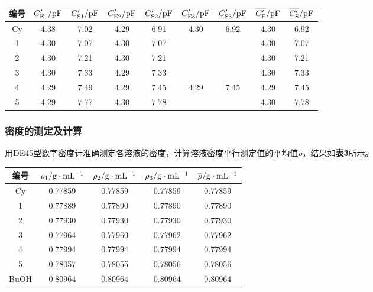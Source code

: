 \documentclass[12pt]{article}
\begin{document}
\begin{table}[h]
	\centering
	\begin{tabular}{ccccccccc}
		\toprule
		编号 & $C^{\prime}_{\rm E1}/{\rm pF}$ & $C^{\prime}_{\rm S1}/{\rm pF}$ & $C^{\prime}_{\rm E2}/{\rm pF}$ & $C^{\prime}_{\rm S2}/{\rm pF}$ & $C^{\prime}_{\rm E3}/{\rm pF}$ & $C^{\prime}_{\rm S3}/{\rm pF}$ & $\overline{C^{\prime}_{\rm E}}/{\rm pF}$ & $\overline{C^{\prime}_{\rm S}}/{\rm pF}$ \\
		\midrule
		Cy & 4.38 & 7.02 & 4.29 & 6.91 & 4.30 & 6.92 & 4.30 & 6.92 \\
		1  & 4.30 & 7.07 & 4.30 & 7.07 &      &      & 4.30 & 7.07 \\
		2  & 4.30 & 7.21 & 4.30 & 7.21 &      &      & 4.30 & 7.21 \\
		3  & 4.30 & 7.33 & 4.29 & 7.33 &      &      & 4.30 & 7.33 \\
		4  & 4.29 & 7.49 & 4.29 & 7.45 & 4.29 & 7.45 & 4.29 & 7.45 \\
		5  & 4.29 & 7.77 & 4.30 & 7.78 &      &      & 4.30 & 7.78 \\
		\bottomrule
	\end{tabular}
\end{table}
\par

\subsubsection{密度的测定及计算}
用DE45型数字密度计准确测定各溶液的密度，计算溶液密度平行测定值的平均值$\overline{\rho}$，结果如\textbf{表3}所示。
\begin{table}[h]
	\centering
	\begin{tabular}{ccccc}
		\toprule
		编号 & $\rho_{1}/{\rm g\cdot mL^{-1}}$ & $\rho_{2}/{\rm g\cdot mL^{-1}}$ & $\rho_{3}/{\rm g\cdot mL^{-1}}$ & $\overline{\rho}/{\rm g\cdot mL^{-1}}$ \\
		\midrule
		Cy   & 0.77859 & 0.77859 & 0.77859 & 0.77859 \\
		1    & 0.77889 & 0.77890 & 0.77890 & 0.77890 \\
		2    & 0.77930 & 0.77930 & 0.77930 & 0.77930 \\
		3    & 0.77964 & 0.77960 & 0.77962 & 0.77962 \\
		4    & 0.77994 & 0.77994 & 0.77994 & 0.77994 \\
		5    & 0.78057 & 0.78055 & 0.78056 & 0.78056 \\
		BuOH & 0.80964 & 0.80964 & 0.80964 & 0.80964 \\
		\bottomrule
	\end{tabular}
\end{table}
\par
\end{document}
